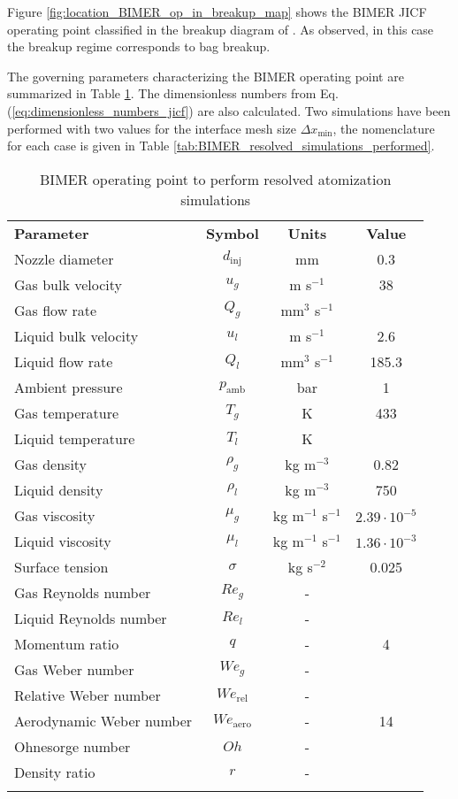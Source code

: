 Figure \ref{fig:location_BIMER_op_in_breakup_map} shows the BIMER JICF operating point classified in the breakup diagram of \citeColor[wu_breakup_1997]. As observed, in this case the breakup regime corresponds to bag breakup.

The governing parameters characterizing the BIMER operating point are summarized in Table \ref{tab:bimer_sps_operating_point}. The dimensionless numbers from Eq. (\ref{eq:dimensionless_numbers_jicf}) are also calculated. Two simulations have been performed with two values for the interface mesh size $\Delta x_\mathrm{min}$, the nomenclature for each case is given in Table \ref{tab:BIMER_resolved_simulations_performed}.

\clearpage


\begin{table}[!h]
\centering
\caption{BIMER operating point to perform resolved atomization simulations}
\begin{tabular}{lccc}
\thickhline
\textbf{Parameter} & \textbf{Symbol} & \textbf{Units} &  \textbf{Value} \\
\thickhline
Nozzle diameter & $d_\mathrm{inj}$ & mm & 0.3 \\
Gas bulk velocity & $u_g$ & m s$^{-1}$ & 38 \\
Gas flow rate & $Q_g$ & mm$^3$ s$^{-1}$ &   \\
Liquid bulk velocity & $u_l$ & m s$^{-1}$ & 2.6  \\
Liquid flow rate & $Q_l$ & mm$^3$ s$^{-1}$ & 185.3  \\
Ambient pressure & $p_\mathrm{amb}$ & bar &  1 \\
Gas temperature & $T_g$ & K & 433 \\
Liquid temperature & $T_l$ & K &  \\
Gas density & $\rho_g$ & kg m$^{-3}$ & 0.82 \\
Liquid density & $\rho_l$ & kg m$^{-3}$ & 750 \\
Gas viscosity & $\mu_g$ & kg m$^{-1}$ s$^{-1}$ & $2.39 \cdot 10^{-5}$ \\
Liquid viscosity & $\mu_l$ & kg m$^{-1}$ s$^{-1}$ &  $1.36 \cdot 10^{-3}$ \\
Surface tension & $\sigma$ & kg s$^{-2}$ &  0.025  \\
\thickhline
Gas Reynolds number & $Re_g$ & - & \\
Liquid Reynolds number & $Re_l$ & - &  \\
Momentum ratio & $q$ & - & 4  \\
Gas Weber number & $We_g$ & - &  \\
Relative Weber number & $We_\mathrm{rel}$ & - & \\
Aerodynamic Weber number & $We_\mathrm{aero}$ & - & 14 \\
Ohnesorge number & $Oh $ & - & \\
Density ratio & $r$ & - & \\
\thickhline
\end{tabular}
\label{tab:bimer_sps_operating_point}
\end{table}


